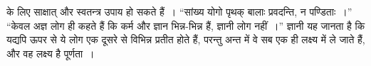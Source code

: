 के लिए साक्षात् और स्वतन्त्र उपाय हो सकते हैं~। “सांख्य योगो पृथक् बालाः प्रवदन्ति, न पण्डिताः~।” “केवल अज्ञ लोग ही कहते हैं कि कर्म और ज्ञान भिन्न-भिन्न हैं, ज्ञानी लोग नहीं~।” ज्ञानी यह जानता है कि यद्यपि ऊपर से ये लोग एक दूसरे से विभिन्न प्रतीत होते हैं, परन्तु अन्त में वे सब एक ही लक्ष्य में ले जाते हैं, और वह लक्ष्य है पूर्णता~।

